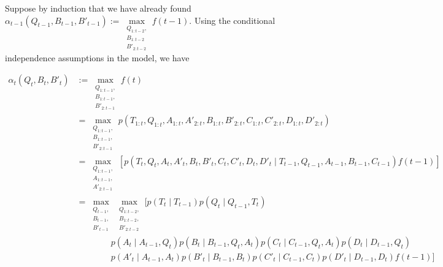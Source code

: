 \documentclass[11pt]{article}
\begin{document}
\begin{small}
Suppose by induction that we have already found $\alpha_{t-1}(Q_{t-1}, B_{t-1}, B'_{t-1}) := \max\limits_{\substack{Q_{1:t-2},\\ B_{1:t-2}\\B'_{2:t-2}}} f(t-1)$. Using the conditional independence assumptions in the model, we have
\begin{tiny}
\begin{align*}
\alpha_t(Q_t, B_t, B'_t) &:=
\max\limits_{\substack{Q_{1:t-1},\\ B_{1:t-1},\\B'_{2:t-1}}} f(t)\\ 
&= \max\limits_{\substack{Q_{1:t-1},\\ B_{1:t-1},\\B'_{2:t-1}}} p(T_{1:t}, Q_{1:t}, A_{1:t}, A'_{2:t}, B_{1:t}, B'_{2:t}, C_{1:t}, C'_{2:t}, D_{1:t}, D'_{2:t})\\
&= \max\limits_{\substack{Q_{1:t-1},\\ A_{1:t-1},\\A'_{2:t-1}}}
\left[
p(T_t, Q_t, A_t, A'_t, B_t, B'_t, C_t, C'_t, D_t, D'_t \mid T_{t-1}, Q_{t-1}, A_{t-1}, B_{t-1}, C_{t-1} ) f(t-1)
\right]\\
&= \max\limits_{\substack{Q_{t-1},\\ B_{t-1},\\B'_{t-1}}} \max\limits_{\substack{Q_{1:t-2},\\ B_{1:t-2},\\B'_{2:t-2}}}
\Bigg[
p(T_t \mid T_{t-1})
p(Q_t \mid Q_{t-1}, T_t)\\&\qquad\qquad
p(A_t \mid A_{t-1}, Q_t)
p(B_t \mid B_{t-1}, Q_t, A_t)
p(C_t \mid C_{t-1}, Q_t, A_t)
p(D_t \mid D_{t-1}, Q_t)\\&\qquad\qquad
p(A'_t \mid A_{t-1}, A_t)
p(B'_t \mid B_{t-1}, B_t)
p(C'_t \mid C_{t-1}, C_t)
p(D'_t \mid D_{t-1}, D_t)
f(t-1)\Bigg]\\

\end{align*}
\end{tiny}
\end{small}
\end{document}
